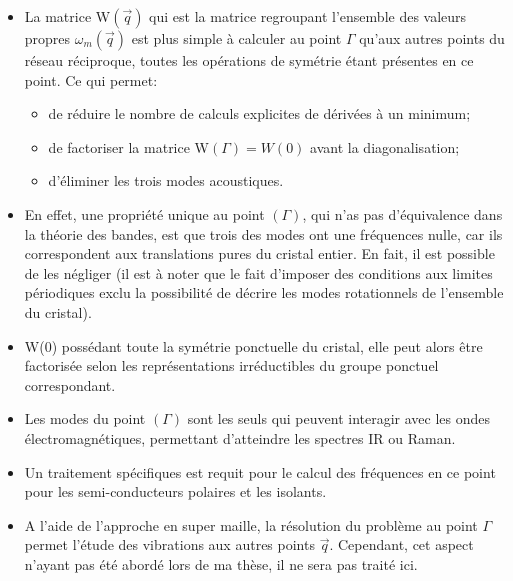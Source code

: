 \documentclass[12pt,a4paper]{book}
\begin{document}
\begin{itemize}
	\item[\textbullet] La matrice W$(\overrightarrow{q})$ qui est la matrice regroupant l'ensemble des valeurs propres $\omega_{m}(\overrightarrow{q})$ est plus simple à calculer au point $\Gamma$ qu'aux autres points du réseau réciproque, toutes les opérations de symétrie étant présentes en ce point. Ce qui permet:
	\begin{itemize}
	\item de réduire le nombre de calculs explicites de dérivées à un minimum;
	\item de factoriser la matrice W$(\Gamma) = W(0)$ avant la diagonalisation;
	\item d'éliminer les trois modes acoustiques.	
	\end{itemize}
	
	\bigskip
	
\item[\textbullet] En effet, une propriété unique au point $(\Gamma)$, qui n'as pas d'équivalence  dans la théorie des bandes, est que trois des modes ont une fréquences nulle, car ils correspondent aux translations pures du cristal entier. En fait, il est possible de les négliger (il est à noter que le fait d'imposer des conditions aux limites périodiques exclu la possibilité de décrire les modes rotationnels de l'ensemble du cristal).
\bigskip

\item[\textbullet] W(0) possédant toute la symétrie ponctuelle du cristal, elle peut alors être factorisée selon les représentations irréductibles du groupe ponctuel correspondant.
\bigskip

\item[\textbullet] Les modes du point $(\Gamma)$ sont les seuls qui peuvent interagir avec les ondes électromagnétiques, permettant d'atteindre les spectres IR ou Raman. 
\bigskip

\item[\textbullet] Un traitement spécifiques est requit pour le calcul des fréquences en ce point pour les semi-conducteurs polaires et les isolants. 
\bigskip

\item[\textbullet] A l'aide de l'approche en super maille, la résolution du problème au point $\Gamma$ permet l'étude des vibrations aux autres points $\overrightarrow{q}$. Cependant, cet aspect n'ayant pas été abordé lors de ma thèse, il ne sera pas traité ici. 
\end{itemize}
\end{document}
